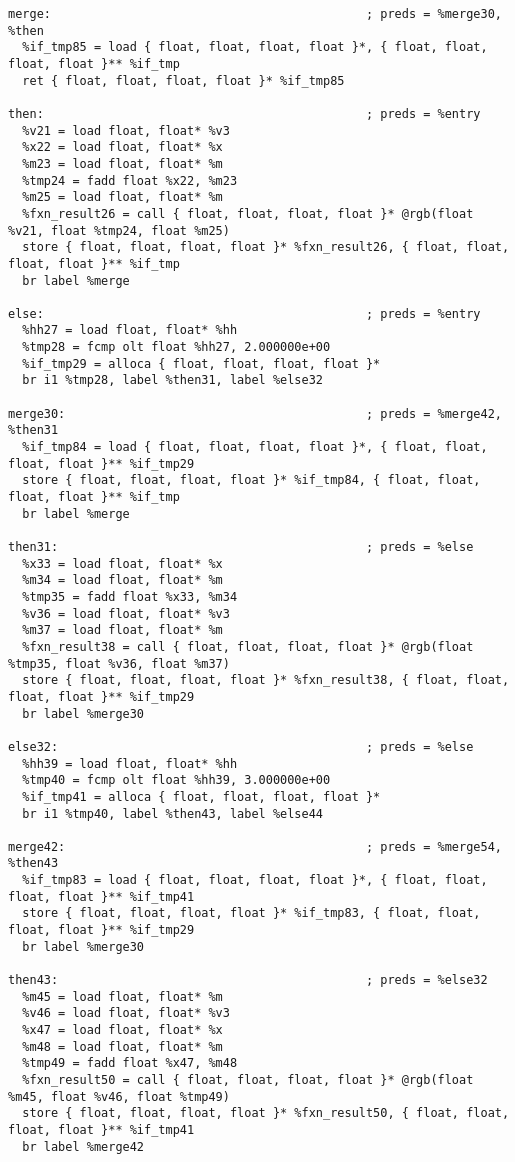 \documentclass[main.tex]{subfiles}
\begin{document}
{\begin{lstlisting}
merge:                                            ; preds = %merge30, %then
  %if_tmp85 = load { float, float, float, float }*, { float, float, float, float }** %if_tmp
  ret { float, float, float, float }* %if_tmp85

then:                                             ; preds = %entry
  %v21 = load float, float* %v3
  %x22 = load float, float* %x
  %m23 = load float, float* %m
  %tmp24 = fadd float %x22, %m23
  %m25 = load float, float* %m
  %fxn_result26 = call { float, float, float, float }* @rgb(float %v21, float %tmp24, float %m25)
  store { float, float, float, float }* %fxn_result26, { float, float, float, float }** %if_tmp
  br label %merge

else:                                             ; preds = %entry
  %hh27 = load float, float* %hh
  %tmp28 = fcmp olt float %hh27, 2.000000e+00
  %if_tmp29 = alloca { float, float, float, float }*
  br i1 %tmp28, label %then31, label %else32

merge30:                                          ; preds = %merge42, %then31
  %if_tmp84 = load { float, float, float, float }*, { float, float, float, float }** %if_tmp29
  store { float, float, float, float }* %if_tmp84, { float, float, float, float }** %if_tmp
  br label %merge

then31:                                           ; preds = %else
  %x33 = load float, float* %x
  %m34 = load float, float* %m
  %tmp35 = fadd float %x33, %m34
  %v36 = load float, float* %v3
  %m37 = load float, float* %m
  %fxn_result38 = call { float, float, float, float }* @rgb(float %tmp35, float %v36, float %m37)
  store { float, float, float, float }* %fxn_result38, { float, float, float, float }** %if_tmp29
  br label %merge30

else32:                                           ; preds = %else
  %hh39 = load float, float* %hh
  %tmp40 = fcmp olt float %hh39, 3.000000e+00
  %if_tmp41 = alloca { float, float, float, float }*
  br i1 %tmp40, label %then43, label %else44

merge42:                                          ; preds = %merge54, %then43
  %if_tmp83 = load { float, float, float, float }*, { float, float, float, float }** %if_tmp41
  store { float, float, float, float }* %if_tmp83, { float, float, float, float }** %if_tmp29
  br label %merge30

then43:                                           ; preds = %else32
  %m45 = load float, float* %m
  %v46 = load float, float* %v3
  %x47 = load float, float* %x
  %m48 = load float, float* %m
  %tmp49 = fadd float %x47, %m48
  %fxn_result50 = call { float, float, float, float }* @rgb(float %m45, float %v46, float %tmp49)
  store { float, float, float, float }* %fxn_result50, { float, float, float, float }** %if_tmp41
  br label %merge42


\end{lstlisting}}
\end{document}
